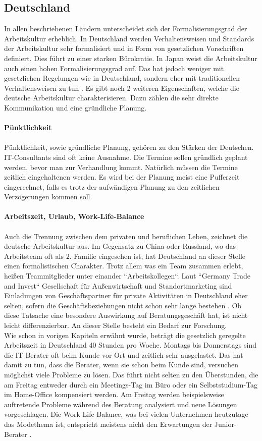 	\subsection{Deutschland}
	In allen beschriebenen Ländern unterscheidet sich der Formalisierungsgrad der Arbeitskultur erheblich. In Deutschland werden Verhaltensweisen und Standards der Arbeitskultur sehr formalisiert und in Form von gesetzlichen Vorschriften definiert. Dies führt zu einer starken Bürokratie. In Japan weist die Arbeitskultur auch einen hohen Formalisierungsgrad auf. Das hat jedoch weniger mit gesetzlichen Regelungen wie in Deutschland, sondern eher mit traditionellen Verhaltensweisen zu tun \cite[236]{3LaenderVergl}. Es gibt noch 2 weiteren Eigenschaften, welche die deutsche Arbeitskultur charakterisieren. Dazu zählen die sehr direkte Kommunikation und eine gründliche Planung.\\ \\
	\textbf{Pünktlichkeit}\\ \\
	Pünktlichkeit, sowie gründliche Planung, gehören zu den Stärken der Deutschen. IT-Consultants sind oft keine Ausnahme. Die Termine sollen gründlich geplant werden, bevor man zur Verhandlung kommt. Natürlich müssen die Termine zeitlich eingehaltenen werden. Es wird bei der Planung meist eine Pufferzeit eingerechnet, falls es trotz der aufwändigen Planung zu den zeitlichen Verzögerungen kommen soll.\\ \\
	\textbf{Arbeitszeit, Urlaub, Work-Life-Balance 
	} \\ \\
	Auch die  Trennung zwischen dem privaten und beruflichen Leben, zeichnet die  deutsche Arbeitskultur aus. Im Gegensatz zu China oder Russland, wo das Arbeitsteam oft als 2. Familie eingesehen ist, hat Deutschland an dieser Stelle einen formalistischen Charakter. Trotz allem was ein Team zusammen erlebt, heißen Teammitglieder unter einander ``Arbeitskollegen``. Laut ``Germany Trade and Invest``
	Gesellschaft für Außenwirtschaft und Standortmarketing sind Einladungen  von Geschäftspartner für private Aktivitäten in Deutschland eher selten, sofern die  Geschäftsbeziehungen nicht schon sehr lange bestehen \cite{ArbKulturDE}. Ob diese Tatsache eine besondere Auswirkung auf Beratungsgeschäft hat, ist nicht leicht differenzierbar. An dieser Stelle besteht ein Bedarf zur Forschung. \\
	Wie schon in vorigen Kapiteln erwähnt wurde, beträgt die gesetzlich geregelte Arbeitszeit in Deutschland 40 Stunden pro Woche. Montags bis Donnerstags sind die IT-Berater oft beim Kunde vor Ort und zeitlich sehr ausgelastet. Das hat damit zu tun, dass die Berater, wenn sie schon beim Kunde sind, versuchen möglichst viele Probleme zu lösen. Das führt nicht selten zu den Überstunden, die am Freitag entweder durch ein Meetings-Tag im Büro oder ein Selbststudium-Tag im Home-Office kompensiert werden. Am Freitag werden beispielsweise auftretende Probleme während des Beratung analysiert und neue Lösungen vorgeschlagen. Die Work-Life-Balance, was bei vielen Unternehmen heutzutage das Modethema ist, entspricht meistens nicht den Erwartungen der Junior-Berater \cite{JNRBer}. 
